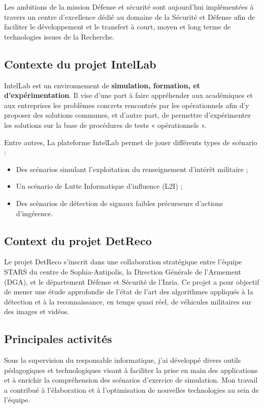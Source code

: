 Les ambitions de la mission Défense et sécurité sont aujourd’hui implémentées à travers un centre d’excellence dédié au domaine de la Sécurité et Défense afin de faciliter le développement et le transfert à court, moyen et long terme de technologies issues de la Recherche.

\subsection{Contexte du projet IntelLab}

IntelLab est un environnement de \textbf{simulation, formation, et d’expérimentation}. Il vise d’une part à faire appréhender aux académiques et aux entreprises les problèmes concrets rencontrés par les opérationnels afin d’y proposer des solutions communes, et d’autre part, de permettre d’expérimenter les solutions sur la base de procédures de tests « opérationnels ».

\noindent Entre autres, La plateforme IntelLab permet de jouer différents types de scénario :

\begin{itemize}\addtolength{\itemsep}{-0.35\baselineskip}%
  \item Des scénarios simulant l'exploitation du renseignement d'intérêt militaire ;
  \item Un scénario de Lutte Informatique d'influence (L2I) ;
  \item Des scénarios de détection de signaux faibles précurseurs d'actions d'ingérence.
\end{itemize}

\subsection{Context du projet DetReco}

Le projet DetReco s'inscrit dans une collaboration stratégique entre l'équipe STARS du centre de Sophia-Antipolis, la Direction Générale de l'Armement (DGA), et le département Défense et Sécurité de l'Inria. Ce projet a pour objectif de mener une étude approfondie de l'état de l'art des algorithmes appliqués à la détection et à la reconnaissance, en temps quasi réel, de véhicules militaires sur des images et vidéos.

\subsection{Principales activités}


Sous la supervision du responsable informatique, j'ai développé divers outils pédagogiques et technologiques visant à faciliter la prise en main des applications et à enrichir la compréhension des scénarios d'exercice de simulation. Mon travail a contribué à l'élaboration et à l'optimisation de nouvelles technologies au sein de l'équipe.

